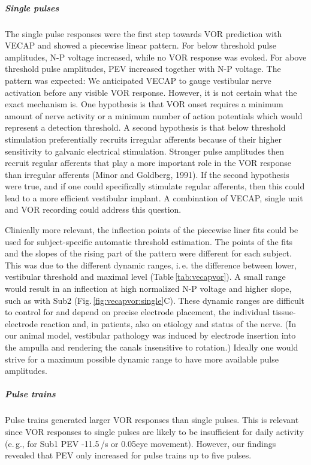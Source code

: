 \subparagraph{Single pulses} The single pulse responses were the first step towards VOR prediction with VECAP and showed a piecewise linear pattern. For below threshold pulse amplitudes, N-P voltage increased, while no VOR response was evoked. For above threshold pulse amplitudes, PEV increased together with N-P voltage. The pattern was expected: We anticipated VECAP to gauge vestibular nerve activation before any visible VOR response. However, it is not certain what the exact mechanism is. One hypothesis is that VOR onset requires a minimum amount of nerve activity or a minimum number of action potentials which would represent a detection threshold. A second hypothesis is that below threshold stimulation preferentially recruits irregular afferents because of their higher sensitivity to galvanic electrical stimulation. Stronger pulse amplitudes then recruit regular afferents that play a more important role in the VOR response than irregular afferents (Minor and Goldberg, 1991). If the second hypothesis were true, and if one could specifically stimulate regular afferents, then this could lead to a more efficient vestibular implant. A combination of VECAP, single unit and VOR recording could address this question.

Clinically more relevant, the inflection points of the piecewise liner fits could be used for subject-specific automatic threshold estimation. The points of the fits and the slopes of the rising part of the pattern were different for each subject. This was due to the different dynamic ranges, i.\,e. the difference between lower, vestibular threshold and maximal level (Table\,\ref{tab:vecapvor}). A small range would result in an inflection at high normalized N-P voltage and higher slope, such as with Sub2 (Fig.\,\ref{fig:vecapvor:single}C). These dynamic ranges are difficult to control for and depend on precise electrode placement, the individual tissue-electrode reaction and, in patients, also on etiology and status of the nerve. (In our animal model, vestibular pathology was induced by electrode insertion into the ampulla and rendering the canals insensitive to rotation.) Ideally one would strive for a maximum possible dynamic range to have more available pulse amplitudes.   

\subparagraph{Pulse trains}
Pulse trains generated larger VOR responses than single pulses. This is relevant since VOR responses to single pulses are likely to be insufficient for daily activity (e.\,g., for Sub1 PEV -11.5\,\degree /s or 0.05\degree eye movement). However, our findings revealed that PEV only increased for pulse trains up to five pulses. 


